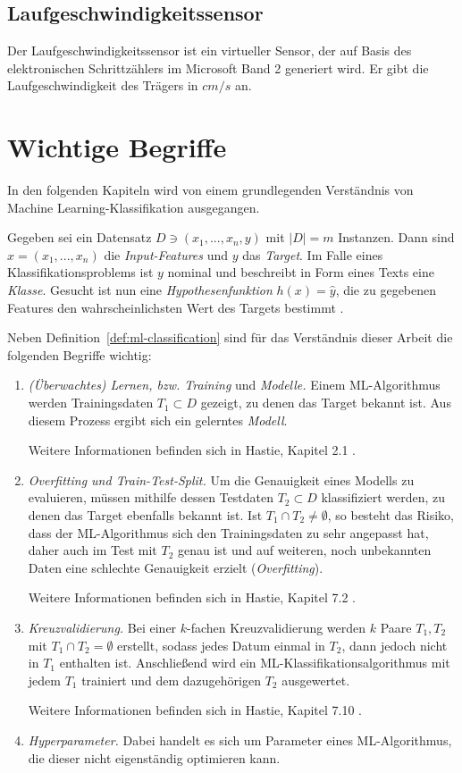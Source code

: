 \subsection{Laufgeschwindigkeitssensor}
Der Laufgeschwindigkeitssensor ist ein virtueller Sensor, der auf Basis des elektronischen Schrittzählers im Microsoft Band 2 generiert wird. Er gibt die Laufgeschwindigkeit des Trägers in $cm/s$ an.

\section{Wichtige Begriffe}
In den folgenden Kapiteln wird von einem grundlegenden Verständnis von Machine Learning-Klassifikation ausgegangen.

\begin{definition}[ML-Klassifikation]
\label{def:ml-classification}
Gegeben sei ein Datensatz $D \ni (x_1, ..., x_n, y)$ mit $|D| = m$ Instanzen. Dann sind $x = (x_1, ..., x_n)$ die \textit{Input-Features} und $y$ das \textit{Target}. Im Falle eines Klassifikationsproblems ist $y$ nominal und beschreibt in Form eines Texts eine \textit{Klasse}. Gesucht ist nun eine \textit{Hypothesenfunktion} $h(x) = \hat{y}$, die zu gegebenen Features den wahrscheinlichsten Wert des Targets bestimmt \cite{Ng2011a}.
\end{definition}
Neben Definition~\ref{def:ml-classification} sind für das Verständnis dieser Arbeit die folgenden Begriffe wichtig:
\begin{enumerate}
\item \textit{(Überwachtes) Lernen, bzw. Training} und \textit{Modelle.} Einem ML-Algorithmus werden Trainingsdaten $T_1 \subset D$ gezeigt, zu denen das Target bekannt ist. Aus diesem Prozess ergibt sich ein gelerntes \textit{Modell}. 

Weitere Informationen befinden sich in Hastie, Kapitel 2.1 \cite{Hastie2009}.
\item \textit{Overfitting und Train-Test-Split.} Um die Genauigkeit eines Modells zu evaluieren, müssen mithilfe dessen Testdaten $T_2 \subset D$ klassifiziert werden, zu denen das Target ebenfalls bekannt ist. Ist $T_1 \cap T_2 \neq \emptyset$, so besteht das Risiko, dass der ML-Algorithmus sich den Trainingsdaten zu sehr angepasst hat, daher auch im Test mit $T_2$ genau ist und auf weiteren, noch unbekannten Daten eine schlechte Genauigkeit erzielt (\textit{Overfitting}). 

Weitere Informationen befinden sich in Hastie, Kapitel 7.2 \cite{Hastie2009}.
\item \textit{Kreuzvalidierung.} Bei einer $k$-fachen Kreuzvalidierung werden $k$ Paare $T_1, T_2$ mit $T_1 \cap T_2 = \emptyset$ erstellt, sodass jedes Datum einmal in $T_2$, dann jedoch nicht in $T_1$ enthalten ist. Anschließend wird ein ML-Klassifikationsalgorithmus mit jedem $T_1$ trainiert und dem dazugehörigen $T_2$ ausgewertet. 

Weitere Informationen befinden sich in Hastie, Kapitel 7.10 \cite{Hastie2009}.
\item \textit{Hyperparameter.}  Dabei handelt es sich um Parameter eines ML-Algorithmus, die dieser nicht eigenständig optimieren kann.
\end{enumerate}


